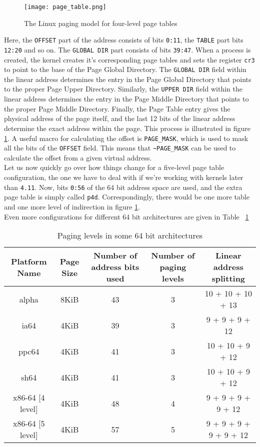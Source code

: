 \documentclass[a4paper,10pt]{article}
\begin{document}
\begin{flushleft}
\begin{figure}[H]
 \centering
 \texttt{[image: page\_table.png]}
 \caption{The Linux paging model for four-level page tables}
 \label{fig:pg_table}
\end{figure}

Here, the \verb|OFFSET| part of the address consists of bits \verb|0:11|, the \verb|TABLE| part bits \verb|12:20| and so on. The \verb|GLOBAL DIR|
part consists of bits \verb|39:47|. When a process is created, the kernel creates it's corresponding page tables and sets the register \verb|cr3| to
point to the base of the Page Global Directory. The \verb|GLOBAL DIR| field within the linear address determines the entry in the Page Global Directory that points to the proper Page Upper Directory. Similarly, the \verb|UPPER DIR| field within the linear address determines the entry in the Page Middle Directory that points to the proper Page Middle Directory. Finally, the Page Table entry gives the physical address of the page itself,
and the last 12 bits of the linear address determine the exact address within the page. This process is illustrated in figure \ref{fig:pg_table}.
A useful macro for calculating the offset is \verb|PAGE_MASK|, which is used to mask all the bits of the \verb|OFFSET| field. This means
that \verb|~PAGE_MASK| can be used to calculate the offset from a given virtual address.\\
Let us now quickly go over how things change for a five-level page table configuration, the one we have to deal with if we're working with kernels
later than \verb|4.11|. Now, bits \verb|0:56| of the 64 bit address space are used, and the extra page table is simply called \verb|p4d|. Correspondingly, there would be one more table and one more level of indirection in figure \ref{fig:pg_table}.\\
Even more configurations for different 64 bit architectures are given in Table ~\ref{Tab:arch}

\begin{table}[H]
\begin{tabular}{|c *{3}{c} c|}
\hline
\rowcolor{lightgray}Platform Name & Page Size & Number of address bits used & Number of paging levels & Linear address splitting\\
\hline
alpha & 8KiB & 43 & 3 & 10 + 10 + 10 + 13\\
ia64 & 4KiB & 39 & 3 & 9 + 9 + 9 + 12\\
ppc64 & 4KiB & 41 & 3 & 10 + 10 + 9 + 12\\
sh64 & 4KiB & 41 & 3 & 10 + 10 + 9 + 12\\
x86-64 [4 level] & 4KiB & 48 & 4 & 9 + 9 + 9 + 9 + 12\\
x86-64 [5 level] & 4KiB & 57 & 5 & 9 + 9 + 9 + 9 + 9 + 12\\
\hline
\end{tabular}
\caption{Paging levels in some 64 bit architectures}
\label{Tab:arch}
\end{table}


\end{flushleft}
\end{document}
